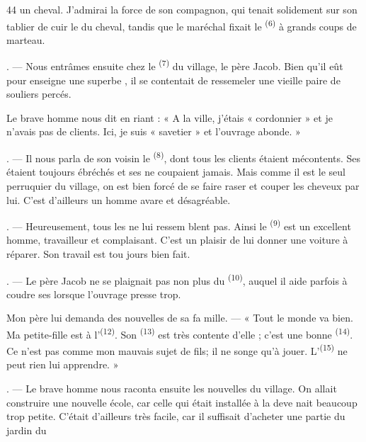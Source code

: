\begin{VUpage}[46]{44}
\VUcontinue
un cheval. J'admirai la force de son compagnon, qui\nl
tenait solidement sur son tablier de cuir le  du\nl
cheval, tandis que le maréchal fixait le \textsuperscript{(6)} à grands\nl
coups de marteau.

. --- Nous entrâmes ensuite chez le \textsuperscript{(7)}\nl
du village, le père Jacob. Bien qu'il eût pour enseigne\nl
une superbe , il se contentait de ressemeler\nl
une vieille paire de souliers percés.

\VUblancAlinea
Le brave homme nous dit en riant : « A la ville,\nl
j'étais « cordonnier » et je n'avais pas de clients.\nl
Ici, je suis « savetier » et l'ouvrage abonde. »

. --- Il nous parla de son voisin le \textsuperscript{(8)}, dont\nl
tous les clients étaient mécontents. Ses \nl
étaient toujours ébréchés et ses  ne coupaient\nl
jamais. Mais comme il est le seul perruquier du\nl
village, on est bien forcé de se faire raser et couper\nl
les cheveux par lui. C'est d'ailleurs un homme avare\nl
et désagréable.

. --- Heureusement, tous les  ne lui ressem\cc
blent pas. Ainsi le \textsuperscript{(9)} est un excellent homme,\nl
travailleur et complaisant. C'est un plaisir de lui\nl
donner une voiture à réparer. Son travail est tou\cc
jours bien fait.

. --- Le père Jacob ne se plaignait pas non plus du\nl
{}\textsuperscript{(10)}, auquel il aide parfois à coudre ses \nl
lorsque l'ouvrage presse trop.

\VUblancAlinea
Mon père lui demanda des nouvelles de sa fa\cc
mille. --- « Tout le monde va bien. Ma petite-fille est\nl
à l'\textsuperscript{(12)}. Son \textsuperscript{(13)} est très contente\nl
d'elle ; c'est une bonne \textsuperscript{(14)}. Ce n'est pas comme\nl
mon mauvais sujet de fils; il ne songe qu'à jouer.\nl
L'\textsuperscript{(15)} ne peut rien lui apprendre. »

. --- Le brave homme nous raconta ensuite les\nl
nouvelles du village. On allait construire une nouvelle\nl
école, car celle qui était installée à la  deve\cc
nait beaucoup trop petite. C'était d'ailleurs très facile,\nl
car il suffisait d'acheter une partie du jardin du
\parplein
\end{VUpage}

